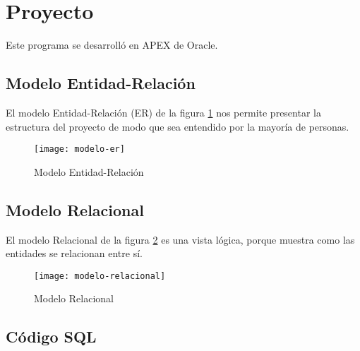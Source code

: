 \section{Proyecto}
Este programa se desarrolló en APEX de Oracle.
\subsection{Modelo Entidad-Relación}
El modelo Entidad-Relación (ER) de la figura \ref{fig:modelo-er} nos permite presentar la estructura del proyecto de modo que sea entendido por la mayoría de personas.
\begin{figure}[H]
  \centering
  \texttt{[image: modelo-er]}
  \caption{Modelo Entidad-Relación}
  \label{fig:modelo-er}
\end{figure}

\subsection{Modelo Relacional}
El modelo Relacional de la figura \ref{fig:modelo-relacional} es una vista lógica, porque muestra como las entidades se relacionan entre sí.
\begin{figure}[H]
  \centering
  \texttt{[image: modelo-relacional]}
  \caption{Modelo Relacional}
  \label{fig:modelo-relacional}
\end{figure}

\subsection{Código SQL}

